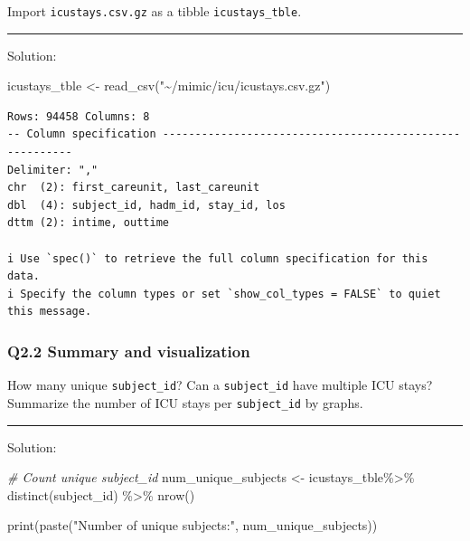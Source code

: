 \documentclass[
]{article}
\newenvironment{Shaded}{\begin{snugshade}}{\end{snugshade}}
\newcommand{\CommentTok}[1]{\textcolor[rgb]{0.56,0.35,0.01}{\textit{#1}}}
\newcommand{\FunctionTok}[1]{\textcolor[rgb]{0.00,0.00,0.00}{#1}}
\newcommand{\NormalTok}[1]{\textcolor[rgb]{0.00,0.00,0.00}{#1}}
\newcommand{\OtherTok}[1]{\textcolor[rgb]{0.56,0.35,0.01}{#1}}
\newcommand{\SpecialCharTok}[1]{\textcolor[rgb]{0.00,0.00,0.00}{#1}}
\newcommand{\StringTok}[1]{\textcolor[rgb]{0.31,0.60,0.02}{#1}}
\begin{document}
Import \texttt{icustays.csv.gz} as a tibble \texttt{icustays\_tble}.

\begin{center}\rule{0.5\linewidth}{0.5pt}\end{center}

Solution:

\begin{Shaded}
\begin{Highlighting}[]
\NormalTok{icustays\_tble }\OtherTok{\textless{}{-}} \FunctionTok{read\_csv}\NormalTok{(}\StringTok{"\textasciitilde{}/mimic/icu/icustays.csv.gz"}\NormalTok{)}
\end{Highlighting}
\end{Shaded}

\begin{verbatim}
Rows: 94458 Columns: 8
-- Column specification --------------------------------------------------------
Delimiter: ","
chr  (2): first_careunit, last_careunit
dbl  (4): subject_id, hadm_id, stay_id, los
dttm (2): intime, outtime

i Use `spec()` to retrieve the full column specification for this data.
i Specify the column types or set `show_col_types = FALSE` to quiet this message.
\end{verbatim}

\hypertarget{q2.2-summary-and-visualization}{%
\subsubsection{Q2.2 Summary and
visualization}\label{q2.2-summary-and-visualization}}

How many unique \texttt{subject\_id}? Can a \texttt{subject\_id} have
multiple ICU stays? Summarize the number of ICU stays per
\texttt{subject\_id} by graphs.

\begin{center}\rule{0.5\linewidth}{0.5pt}\end{center}

Solution:

\begin{Shaded}
\begin{Highlighting}[]
\CommentTok{\# Count unique subject\_id}
\NormalTok{num\_unique\_subjects }\OtherTok{\textless{}{-}}\NormalTok{ icustays\_tble}\SpecialCharTok{\%\textgreater{}\%} 
  \FunctionTok{distinct}\NormalTok{(subject\_id) }\SpecialCharTok{\%\textgreater{}\%} 
  \FunctionTok{nrow}\NormalTok{()}

\FunctionTok{print}\NormalTok{(}\FunctionTok{paste}\NormalTok{(}\StringTok{"Number of unique subjects:"}\NormalTok{, num\_unique\_subjects))}
\end{Highlighting}
\end{Shaded}
\end{document}
